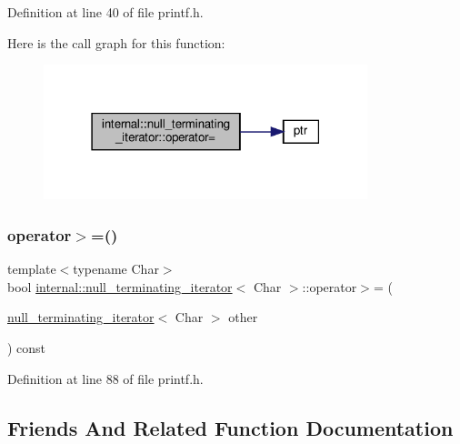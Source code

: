 Definition at line 40 of file printf.\+h.

Here is the call graph for this function\+:
\nopagebreak
\begin{figure}[H]
\begin{center}
\leavevmode
\includegraphics[width=267pt]{classinternal_1_1null__terminating__iterator_a91b88c0a6cbe8b2857227e0536153324_cgraph}
\end{center}
\end{figure}
\mbox{\label{classinternal_1_1null__terminating__iterator_ad3bc6375b671d61c6a9e286bd5bb9a4b}} 
\subsubsection{\texorpdfstring{operator$>$=()}{operator>=()}}
{\footnotesize\ttfamily template$<$typename Char$>$ \\
bool \hyperlink{classinternal_1_1null__terminating__iterator}{internal\+::null\+\_\+terminating\+\_\+iterator}$<$ Char $>$\+::operator$>$= (\begin{DoxyParamCaption}\item[{\hyperlink{classinternal_1_1null__terminating__iterator}{null\+\_\+terminating\+\_\+iterator}$<$ Char $>$}]{other }\end{DoxyParamCaption}) const\hspace{0.3cm}{\ttfamily [inline]}}



Definition at line 88 of file printf.\+h.



\subsection{Friends And Related Function Documentation}
\mbox{\label{classinternal_1_1null__terminating__iterator_a4c00a1495d35eaba6b67c8e0777e6234}} 
